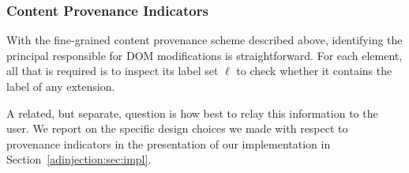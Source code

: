 \subsubsection{Content Provenance Indicators}
\label{adinjection:sec:design:indicators}

With the fine-grained content provenance scheme described above, identifying the
principal responsible for DOM modifications is straightforward. For each
element, all that is required is to inspect its label set \(\ell\) to check
whether it contains the label of any extension.

A related, but separate, question is how best to relay this information to the
user. We report on the specific design choices we made with respect to
provenance indicators in the presentation of our implementation in
Section~\ref{adinjection:sec:impl}.
